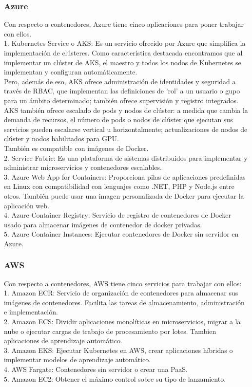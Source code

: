 \documentclass[english,runningheads,a4paper]{llncs}[2018/03/10]
\begin{document}
\subsubsection*{Azure}
Con respecto a contenedores, Azure tiene cinco aplicaciones para poner trabajar 
con ellos. \\
1. Kubernetes Service o AKS: Es un servicio ofrecido por Azure que simplifica la
implementación de clústeres. Como característica destacada encontramos que al 
implementar un clúster de AKS, el maestro y todos los nodos de Kubernetes se 
implementan y configuran automáticamente. \\
Pero, además de eso, AKS ofrece administración de identidades y seguridad a 
través de RBAC, que implementan las definiciones de 'rol' a un usuario o gupo 
para un ámbito determinado; también ofrece supervisión y registro integrados. \\
AKS también ofrece escalado de pods y nodos de clúster: a medida que cambia la 
demanda de recursos, el número de pods o nodos de clúster que ejecutan sus 
servicios pueden escalarse vertical u horizontalmente;  actualizaciones de 
nodos de clúster y nodos habilitados para GPU. \\
También es compatible con imágenes de Docker.\\
2. Service Fabric: Es una plataforma de sistemas distribuidos para implementar 
y administrar microservicios y contenedores escalables. \\
3. Azure Web App for Containers: Proporciona pilas de aplicaciones predefinidas 
en Linux con compatibilidad con lenguajes como .NET, PHP y Node.js entre otros. 
También puede usar una imagen personalizada de Docker para ejecutar la 
aplicación web. \\
4. Azure Container Registry: Servicio de registro de contenedores de Docker 
usado para almacenar imágenes de contenedor de docker privadas. \\
5. Azure Container Instances: Ejecutar contenedores de Docker sin servidor en 
Azure.

\subsubsection*{AWS}
Con respecto a contenedores, AWS tiene cinco servicios para trabajar con ellos: 
\\
1. Amazon ECR: Servicio de organización de contenedores para almacenar sus 
imágenes de contenedores. Facilita las tareas de almacenamiento, administración 
e implementación. \\
2. Amazon ECS: Dividir aplicaciones monolíticas en microservicios, migrar a la 
nube o ejecutar cargas de trabajo de procesamiento por lotes. Tambien 
aplicaciones de aprendizaje automático. \\
3. Amazon EKS: Ejecutar Kubernetes en AWS, crear aplicaciones híbridas o 
implementar modelos de aprendizaje automático. \\
4. AWS Fargate: Contenedores sin servidor o crear una PaaS. \\
5. Amazon EC2: Obtener el máximo control sobre su tipo de lanzamiento.
\end{document}
